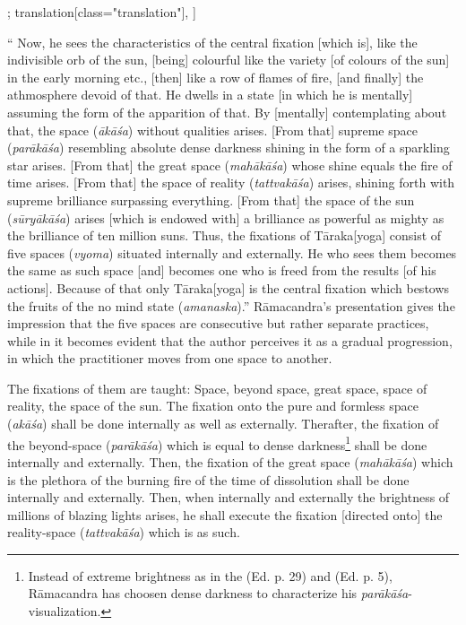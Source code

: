 \begin{alignment}[
  texts=edition[class="edition"];
  translation[class="translation"],
  ]
\begin{translation}
\begin{tlate}
{\begin{quote}
\end{quote}
`` Now, he sees the characteristics of the central fixation [which is], like the indivisible orb of the sun, [being] colourful like the variety [of colours of the sun] in the early morning etc., [then] like a row of flames of fire, [and finally] the athmosphere devoid of that. He dwells in a state [in which he is mentally] assuming the form of the apparition of that. By [mentally] contemplating about that, the space (\textit{ākāśa}) without qualities arises. [From that] supreme space (\textit{parākāśa}) resembling absolute dense darkness shining in the form of a sparkling star arises. [From that] the great space (\textit{mahākāśa}) whose shine equals the fire of time arises. [From that] the space of reality (\textit{tattvakāśa}) arises, shining forth with supreme brilliance surpassing everything. [From that] the space of the sun (\textit{sūryākāśa}) arises [which is endowed with] a brilliance as powerful as mighty as the brilliance of ten million suns. Thus, the fixations of Tāraka[yoga] consist of five spaces (\textit{vyoma}) situated internally and externally. He who sees them becomes the same as such space [and] becomes one who is freed from the results [of his actions]. Because of that only Tāraka[yoga] is the central fixation which bestows the fruits of the no mind state (\textit{amanaska}).''
Rāmacandra's presentation gives the impression that the five spaces are consecutive but rather separate practices, while in  it becomes evident that the author perceives it as a gradual progression, in which the practitioner moves from one space to another.} The fixations of them are taught: Space, beyond space, great space, space of reality, the space of the sun. The fixation onto the pure and formless space (\textit{akāśa}) shall be done internally as well as externally. Therafter, the fixation of the beyond-space (\textit{parākāśa}) which is equal to dense darkness\footnote{Instead of extreme brightness as in the  (Ed. p. 29) and  (Ed. p. 5), Rāmacandra has choosen dense darkness to characterize his \textit{parākāśa}-visualization.} shall be done internally and externally. Then, the fixation of the great space (\textit{mahākāśa}) which is the plethora of the burning fire of the time of dissolution shall be done internally and externally. Then, when internally and externally the brightness of millions of blazing lights arises, he shall execute the fixation [directed onto] the reality-space (\textit{tattvakāśa}) which is as such.\end{tlate}
  \end{translation}
\end{alignment}
